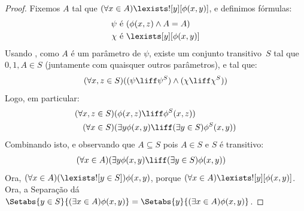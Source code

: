 \documentclass[../../../include/open-logic-section]{subfiles}
\begin{document}
\begin{proof}
Fixemos $A$ tal que $(\forall x \in A)\lexists![y][\phi(x,y)]$, e
definimos fórmulas:
\begin{align*}
	\psi &\text{ é } (\phi(x, z) \land A = A)\\
	\chi &\text{ é } \lexists[y][\phi(x, y)]
\end{align*}
Usando , como $A$ é um parâmetro de $\psi$, existe
um conjunto transitivo~$S$ tal que $0, 1, A \in S$  (juntamente com quaisquer outros
parâmetros), e tal que:
\[
	(\forall x,z \in S)((\psi \liff \psi^S) \land (\chi \liff \chi^S))
\]
Logo, em particular:
\begin{align*}
	(\forall  x, z \in S)(&\phi(x, z) \liff \phi^S(x, z))\\
	(\forall x \in S)(&\exists y\phi(x, y) \liff (\exists y \in S)\phi^S(x, y)) 
\end{align*}
Combinando isto, e observando que $A \subseteq S$ pois $A \in S$ e $S$ é transitivo:
\begin{align*}
	(\forall x \in A)(&\exists y\phi(x, y) \liff (\exists y \in S)\phi(x, y))
\end{align*}
Ora, $(\forall x \in A)(\lexists![y \in S])\phi(x, y)$, porque
$(\forall x \in A)\lexists![y][\phi(x, y)]$. Ora, a Separação dá
$\Setabs{y \in S}{(\exists x \in A) \phi(x, y)} = \Setabs{y}{(\exists
x \in A) \phi(x, y)}$. 
\end{proof}
\end{document}
